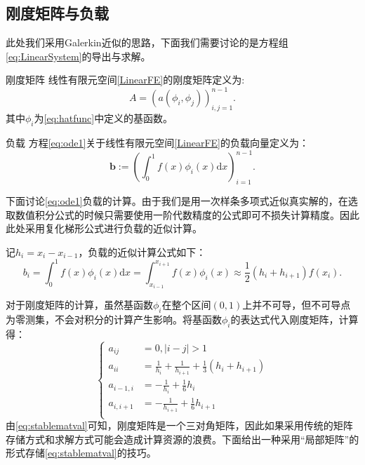 \documentclass[lang=cn,10pt,newtx]{elegantbook}
\newcommand{\dif}{\mathrm{d}}
\begin{document}
\subsection{刚度矩阵与负载}
此处我们采用Galerkin近似的思路，下面我们需要讨论的是方程组\eqref{eq:LinearSystem}的导出与求解。

\begin{definition}{刚度矩阵}
  线性有限元空间\ref{LinearFE}的刚度矩阵定义为:
  \begin{equation}
    \label{eq:stablemat}
    A=(a(\phi_{i},\phi_{j}))_{i,j=1}^{n-1}.
  \end{equation}
  其中$\phi_{i}$为\eqref{eq:hatfunc}中定义的基函数。
\end{definition}

\begin{definition}{负载}
  方程\eqref{eq:ode1}关于线性有限元空间\ref{LinearFE}的负载向量定义为：
  \begin{equation}
    \label{eq:overload}
    \mathbf{b}:=\left(\int_{0}^{1}f(x)\phi_{i}(x)\dif x\right)_{i=1}^{n-1}.
  \end{equation}
\end{definition}

下面讨论\eqref{eq:ode1}负载的计算。由于我们是用一次样条多项式近似真实解的，在选取数值积分公式的时候只需要使用一阶代数精度的公式即可不损失计算精度。因此此处采用复化梯形公式进行负载的近似计算。

记$h_{i}=x_{i}-x_{i-1}$，负载的近似计算公式如下：
\begin{equation}
  b_{i}=\int_{0}^{1}f(x)\phi_{i}(x)\dif x=\int_{x_{i-1}}^{x_{i+1}}f(x)\phi_{i}(x)\approx \frac{1}{2}(h_{i}+h_{i+1})f(x_{i}).
\end{equation}

对于刚度矩阵的计算，虽然基函数$\phi_{i}$在整个区间$(0,1)$上并不可导，但不可导点为零测集，不会对积分的计算产生影响。将基函数$\phi_{i}$的表达式代入刚度矩阵，计算得：
\begin{equation}
  \label{eq:stablematval}
  \left\{
    \begin{aligned}
      a_{ij}&=0,|i-j|>1\\
      a_{ii}&=\frac{1}{h_{i}}+\frac{1}{h_{i+1}}+\frac{1}{3}(h_{i}+h_{i+1})\\
      a_{i-1,i}&=-\frac{1}{h_{i}}+\frac{1}{6}h_{i}\\
      a_{i,i+1}&=-\frac{1}{h_{i+1}}+\frac{1}{6}h_{i+1}\\
    \end{aligned}
  \right.
\end{equation}
由\eqref{eq:stablematval}可知，刚度矩阵是一个三对角矩阵，因此如果采用传统的矩阵存储方式和求解方式可能会造成计算资源的浪费。下面给出一种采用“局部矩阵”的形式存储\eqref{eq:stablematval}的技巧。
\end{document}
